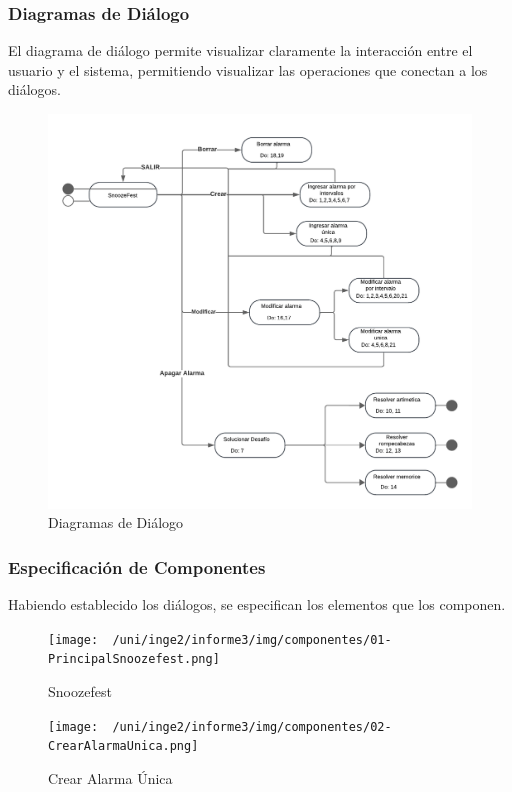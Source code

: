 \subsubsection{Diagramas de Diálogo}
El diagrama de diálogo permite visualizar claramente la interacción entre el usuario y el sistema, permitiendo visualizar las operaciones que conectan a los diálogos.
\begin{figure}[H]
	\centering
	\includegraphics[page=1,width=\textwidth]{./img/dialogos.pdf}
	\caption{Diagramas de Diálogo}
        \vspace{10pt}
	\label{fig:Diagrama de Diálogos}
\end{figure}

\subsubsection{Especificación de Componentes}
Habiendo establecido los diálogos, se especifican los elementos que los componen.

\begin{figure}[H]
	\centering
	\texttt{[image: ~/uni/inge2/informe3/img/componentes/01-PrincipalSnoozefest.png]}
	\caption{Snoozefest}
        \vspace{5pt}
	\label{fig:Snoozefest}
\end{figure}

\begin{figure}[H]
	\centering
	\texttt{[image: ~/uni/inge2/informe3/img/componentes/02-CrearAlarmaUnica.png]}
	\caption{Crear Alarma Única}
        \vspace{5pt}
	\label{fig:Crear Alarma Única}
\end{figure}


